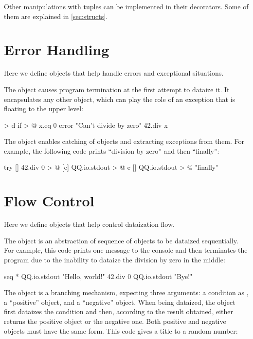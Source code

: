 \documentclass[sigplan,nonacm]{acmart}
\newcommand\aff[1]{\ff{\textcolor{gray}{\(\star\)}#1}}
\newcommand\adeff[1]{\aff{\textcolor{blue!50!black}{\textbf{#1}}}}
\begin{document}
Other manipulations with tuples can be implemented in their
decorators. Some of them are explained in \cref{sec:structs}.

\section{Error Handling}\label{sec:errors}

Here we define objects that help handle errors and exceptional situations.

The \adeff{error} object causes program termination at the first attempt to dataize it.
It encapsulates any other object, which can play the role of an exception that is floating to the upper level:

\begin{ffcode}
[x] > d
  if > @
    x.eq 0
    error "Can't divide by zero"
    42.div x
\end{ffcode}

The \adeff{try} object enables catching of \aff{error} objects and extracting exceptions from them.
For example, the following code prints ``division by zero'' and then ``finally'':

\begin{ffcode}
try
  []
    42.div 0 > @
  [e]
    QQ.io.stdout > @
      e
  []
    QQ.io.stdout > @
      "finally"
\end{ffcode}

\section{Flow Control}\label{sec:flow}

Here we define objects that help control dataization flow.

The \adeff{seq} object is an abstraction of sequence of objects to be dataized sequentially.
For example, this code prints one message to the console and then terminates the program due to the inability to dataize the division by zero in the middle:

\begin{ffcode}
seq *
  QQ.io.stdout "Hello, world!"
  42.div 0
  QQ.io.stdout "Bye!"
\end{ffcode}

The \adeff{if} object is a branching mechanism, expecting three arguments: a
condition as , a ``positive'' object, and a ``negative'' object. When
being dataized, the object \aff{if} first dataizes the condition and then,
according to the result obtained, either returns the positive object or the
negative one. Both positive and negative objects must have the same form. This
code gives a title to a random number:
\end{document}
